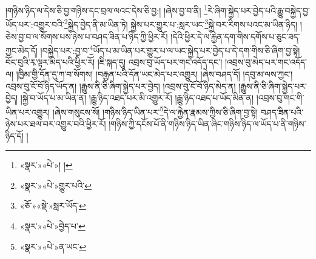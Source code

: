 །གཉིས་ཉིད་ལ་དེས་ཅི་བྱ་གཉིས་དང་བྲལ་ལའང་དེས་ཅི་བྱ:། །ཞེས་བྱ་བ་ནི། \footnote{«སྣར་»«པེ་»། ། }རེ་ཞིག་སྐྱེད་པར་བྱེད་པའི་རྒྱུ་བསྐྱེད་བྱ་ཡོད་པར་:འགྱུར་བའི་\footnote{«སྣར་»«པེ་»གྱུར་པའི་}སྐྱེད་བྱེད་ནི་མ་ཡིན་ཏེ། སྐྱེས་པར་གྱུར་པ་:སླར་ཡང་\footnote{«ཅོ་»«སྡེ་»སླར་ཡོད་}སྐྱེ་བར་རིགས་པའང་མ་ཡིན་ཉིད། །ཅེས་བྱ་བ་ལ་སོགས་པས་ཉེས་པ་བཤད་ཟིན་པ་ཉིད་ཀྱི་ཕྱིར་རོ། །དེའི་ཕྱིར་དེ་ལ་རྐྱེན་དག་གིས་དགོས་པ་ཅུང་ཟད་ཀྱང་མེད་དོ། །བསྐྱེད་པར་:བྱ་བ་\footnote{«སྣར་»«པེ་»བྱེད་པ་}ཡོད་པ་མ་ཡིན་པར་གྱུར་པ་ལ་ཡང་སྐྱེད་པར་བྱེད་པ་དེ་དག་གིས་ཅི་ཞིག་བྱ་སྟེ། བོང་བུའི་རྭ་ལྟར་མེད་པའི་ཕྱིར་རོ། །ཇི་སྐད་དུ། འབྲས་བུ་ཡོད་པར་གང་འདོད་དང་། །འབྲས་བུ་མེད་པར་གང་འདོད་ལ། །ཁྱིམ་གྱི་དོན་དུ་ཀ་བ་སོགས། །བརྒྱན་པའི་དོན་ཡང་མེད་པར་འགྱུར། །ཞེས་བཤད་དོ། །དབུ་མ་ལས་ཀྱང་། འབྲས་བུ་ངོ་བོ་ཉིད་ཡོད་ན། །རྒྱུས་ནི་ཅི་ཞིག་སྐྱེད་པར་བྱེད། །འབྲས་བུ་ངོ་བོ་ཉིད་མེད་ན། །རྒྱུས་ནི་ཅི་ཞིག་སྐྱེད་པར་བྱེད། །སྐྱེ་བ་ཡོད་པ་མ་ཡིན་ན། །རྒྱུ་ཉིད་འཐད་པར་མི་འགྱུར་རོ། །རྒྱུ་ཉིད་འཐད་པ་ཡོད་མིན་ན། །འབྲས་བུ་གང་གི་ཡིན་པར་འགྱུར། །ཞེས་གསུངས་སོ། །གཉིས་ཉིད་ཡིན་པར་\footnote{«སྣར་»«པེ་»ན་ཡང་}དེ་ལ་རྐྱེན་རྣམས་ཀྱིས་ཅི་ཞིག་བྱ་སྟེ། བཤད་ཟིན་པའི་ཉེས་པར་ཐལ་བར་འགྱུར་བའི་ཕྱིར་རོ། །གཉིས་ཀྱི་དངོས་པོ་ནི་གཉིས་ཉིད་ཡིན་ཞིང་གཉིས་ཉིད་ལ་ཡོད་པ་ནི་གཉིས་ཉིད་དོ། །
